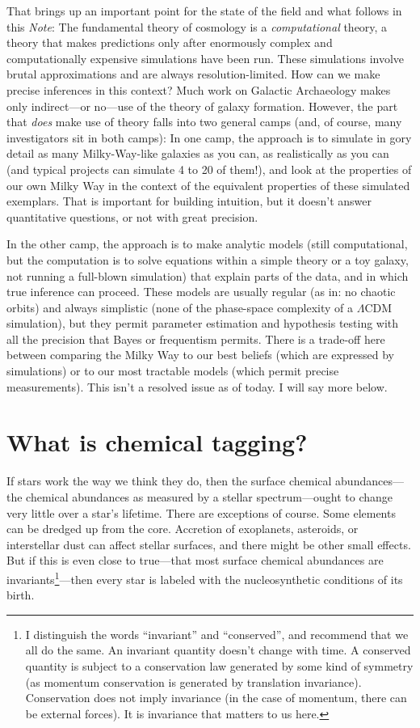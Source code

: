\documentclass[11pt, letterpaper]{article}
\newcommand{\documentname}{\textsl{Note}}
\begin{document}
That brings up an important point for the state of the field and what
follows in this \documentname: The fundamental theory of cosmology is
a \emph{computational} theory, a theory that makes predictions only
after enormously complex and computationally expensive simulations
have been run. These simulations involve brutal approximations and are
always resolution-limited. How can we make precise inferences in this
context?  Much work on Galactic Archaeology makes only indirect---or
no---use of the theory of galaxy formation. However, the part that
\emph{does} make use of theory falls into two general camps (and, of
course, many investigators sit in both camps): In one camp, the
approach is to simulate in gory detail as many Milky-Way-like galaxies
as you can, as realistically as you can (and typical projects can
simulate 4 to 20 of them!), and look at the properties of our own
Milky Way in the context of the equivalent properties of these
simulated exemplars. That is important for building intuition, but
it doesn't answer quantitative questions, or not with great precision.


In the other camp, the approach is to make analytic models (still
computational, but the computation is to solve equations within a
simple theory or a toy galaxy, not running a full-blown simulation)
that explain parts of the data, and in which true inference can
proceed. These models are usually regular (as in: no chaotic orbits)
and always simplistic (none of the phase-space complexity of a
$\Lambda$CDM simulation), but they permit parameter estimation and
hypothesis testing with all the precision that Bayes or frequentism
permits. There is a trade-off here between comparing the Milky Way to
our best beliefs (which are expressed by simulations) or to our most
tractable models (which permit precise measurements). This isn't a
resolved issue as of today. I will say more below.

\section{What is chemical tagging?}

If stars work the way we think they do, then the surface chemical
abundances---the chemical abundances as measured by a stellar
spectrum---ought to change very little over a star's lifetime. There
are exceptions of course. Some elements can be dredged up from the
core. Accretion of exoplanets, asteroids, or interstellar dust can
affect stellar surfaces, and there might be other small effects. But
if this is even close to true---that most surface chemical abundances
are invariants\footnote{I distinguish the words ``invariant'' and
  ``conserved'', and recommend that we all do the same. An invariant
  quantity doesn't change with time. A conserved quantity is subject
  to a conservation law generated by some kind of symmetry (as
  momentum conservation is generated by translation
  invariance). Conservation does not imply invariance (in the case of
  momentum, there can be external forces). It is invariance that
  matters to us here.}---then every star is labeled with the
nucleosynthetic conditions of its birth.
\end{document}
